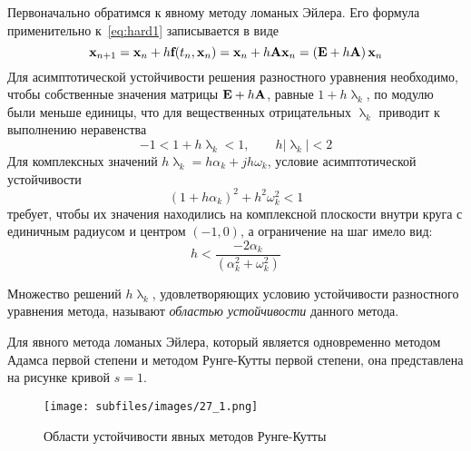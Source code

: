 Первоначально обратимся к явному методу ломаных Эйлера. Его формула применительно к~\eqref{eq:hard1} записывается в виде
\begin{equation*}
    \bf{x}_{n+1} = \bf{x}_n + h\bf{f}(t_n, \bf{x}_n) = \bf{x}_n + h\bf{A}\bf{x}_n = \left( \bf{E} + h\bf{A} \right)\bf{x}_n
\end{equation*}
Для асимптотической устойчивости решения разностного уравнения необходимо, чтобы собственные значения матрицы $\bf{E} + h\bf{A}$,
равные $1 + h\uplambda_k$, по модулю были меньше единицы, что для вещественных отрицательных $\uplambda_k$ приводит
к выполнению неравенства
\begin{equation}
    -1 < 1 + h\uplambda_k < 1, \qquad h|\uplambda_k| < 2 \label{eq:hard2}
\end{equation}
Для комплексных значений $h\uplambda_k = h\alpha_k + jh\omega_k$, условие асимптотической устойчивости
\begin{equation*}
    \left( 1 + h\alpha_k \right)^2 + h^2 \omega_k^2 < 1
\end{equation*}
требует, чтобы их значения находились на комплексной плоскости внутри круга с единичным радиусом и центром $(-1, 0)$,
а ограничение на шаг имело вид:
\begin{equation*}
    h < \frac{-2\alpha_k}{\displaystyle \left( \alpha_k^2 + \omega_k^2 \right)}
\end{equation*}
\begin{definition}
    Множество решений $h\uplambda_k$, удовлетворяющих условию устойчивости разностного уравнения метода, называют
    \emph{областью устойчивости} данного метода.
\end{definition}
Для явного метода ломаных Эйлера, который является одновременно методом Адамса первой степени и методом Рунге-Кутты
первой степени, она представлена на рисунке кривой $s = 1$.
\begin{figure}[H]
    \centering
    \texttt{[image: subfiles/images/27\_1.png]}
    \caption{Области устойчивости явных методов Рунге-Кутты}
\end{figure}

